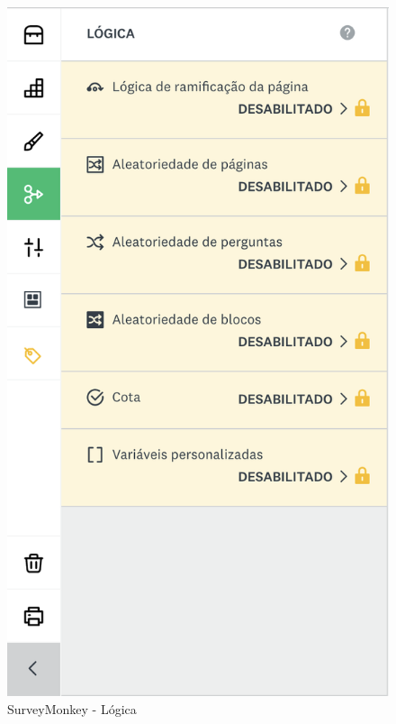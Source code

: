 \begin{figure}[ht!]
\begin{center}
		\hspace{1cm}
		\begin{minipage}{0.45\textwidth}
			\begin{center}
				\includegraphics[height=.32\textheight]{img/surveymonkey-form-logica}
				\caption{SurveyMonkey - Lógica}
				\label{fig:surveymonkey-form-logica}
			\end{center}
		\end{minipage}
	\end{center}
\end{figure}

